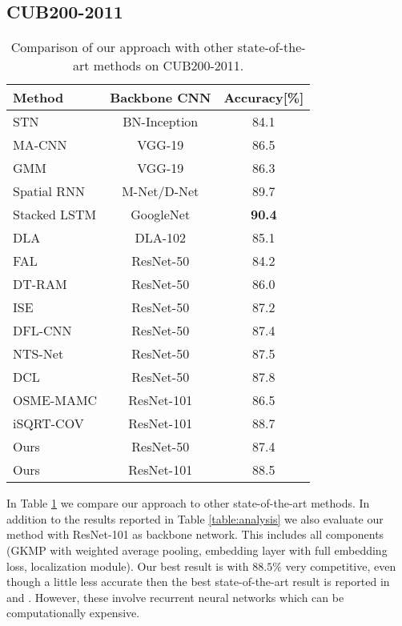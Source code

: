 \documentclass[10pt,twocolumn,letterpaper]{article}
\begin{document}
\subsection{CUB200-2011}
\label{section:birds}
\begin{table}[h]
  \begin{center}
  \begin{tabular} {|l|c|c|}
    \hline
    Method & Backbone CNN & Accuracy[\%] \\
    \hline
    \hline
    STN \cite{jaderberg2015spatial} & BN-Inception & 84.1 \\
    MA-CNN \cite{zheng2017learning} & VGG-19 &  86.5 \\
    GMM \cite{liang2018gmm} & VGG-19 &  86.3 \\
    Spatial RNN \cite{wu2018deep} & M-Net/D-Net & 89.7\\
    Stacked LSTM \cite{Ge_2019_CVPR} & GoogleNet & \bf{90.4} \\
    DLA \cite{yu2018deep} & DLA-102 & 85.1 \\
    FAL \cite{xu2018attend} & ResNet-50 & 84.2 \\
    DT-RAM \cite{li2017dynamic} & ResNet-50 & 86.0 \\
    ISE \cite{simonelli2018increasingly} & ResNet-50 & 87.2 \\ 
    DFL-CNN \cite{wang2018learning} & ResNet-50 &  87.4 \\
    NTS-Net \cite{yang2018learning} & ResNet-50 &  87.5 \\
    DCL \cite{Chen_2019_CVPR} & ResNet-50 & 87.8 \\
    OSME-MAMC \cite{sun2018multi} & ResNet-101 & 86.5 \\
    iSQRT-COV \cite{li2018towards} & ResNet-101 & 88.7 \\
    \hline
    Ours   & ResNet-50  &  87.4 \\
    Ours   & ResNet-101 &  88.5 \\
    \hline
  \end{tabular}
  \end{center}
  \caption{Comparison of our approach with other state-of-the-art methods on CUB200-2011.}
  \label{table:birds}
\end{table}

In Table \ref{table:birds} we compare our approach to other state-of-the-art methods. In addition to the results reported in Table \ref{table:analysis} we also evaluate our method with ResNet-101 as backbone network. This includes all components (GKMP with weighted average pooling, embedding layer with full embedding loss, localization module). Our best result is with $88.5\%$ very competitive, even though a little less accurate then the best state-of-the-art result is reported in \cite{wu2018deep} and \cite{Ge_2019_CVPR}. However, these involve recurrent neural networks which can be computationally expensive. 
\end{document}
